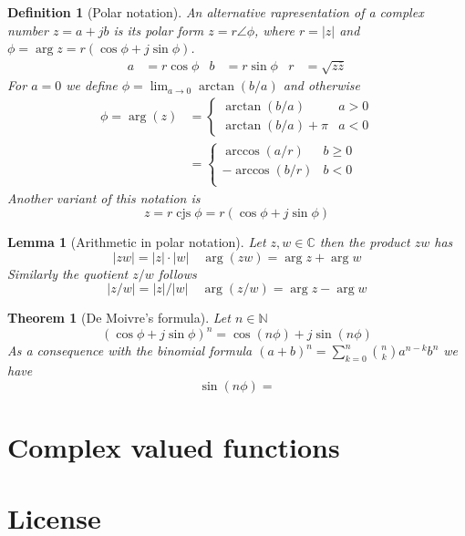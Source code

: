 \documentclass[twocolumn, small]{tex/hsrzf}
\newcommand\Nset{\mathbb{N}}
\newcommand\Cset{\mathbb{C}}
\DeclareMathOperator\cjs{cjs}
\newcommand\conj[1]{\overline{#1}}
\newcommand\len[1]{\lvert#1\rvert}
\theoremstyle{komfourzf}
\newtheorem{theorem}{Theorem}
\newtheorem{definition}{Definition}
\newtheorem{lemma}{Lemma}
\begin{document}
\begin{definition}[Polar notation]
  An alternative rapresentation of a complex number \(z = a + jb\) is its \emph{polar form} \(z = r \angle \phi\), where \(r = \len{z}\) and \(\phi = \arg{z} = r(\cos\phi + j\sin\phi)\).
  \begin{align*}
    a &= r\cos\phi &
    b &= r \sin\phi &
    r &= \sqrt{z\conj{z}}
  \end{align*}
  For \(a = 0\) we define \(\phi = \lim_{a\to 0} \arctan(b/a)\) and otherwise
  \begin{align*}
    \phi = \arg(z)
    &= \begin{cases}
      \arctan(b/a) & a > 0 \\
      \arctan(b/a) + \pi & a < 0
    \end{cases} \\
    &= \begin{cases}
      \arccos(a/r) & b \geq 0 \\
      -\arccos(b/r) & b < 0 \\
    \end{cases}
  \end{align*}
  Another variant of this notation is
  \[
    z = r\cjs\phi = r(\cos\phi + j\sin\phi)
  \]
\end{definition}

\begin{lemma}[Arithmetic in polar notation]
  Let \(z,w\in\Cset\) then the product \(zw\) has
  \[
    \len{zw} = \len{z}\cdot\len{w} \quad
    \arg(zw) = \arg z + \arg w
  \]
  Similarly the quotient \(z/w\) follows
  \[
    \len{z/w} = \len{z}/\len{w} \quad
    \arg(z/w) = \arg z - \arg w
  \]
\end{lemma}

\begin{theorem}[De Moivre's formula]
  Let \(n \in\Nset\)
  \[
    \left(\cos\phi + j\sin\phi\right)^n = \cos(n\phi) + j\sin(n\phi)
  \]
  As a consequence with the binomial formula
  \((a + b)^n = \sum_{k=0}^n \binom{n}{k} a^{n-k} b^n\) we have
  \[
    \sin(n\phi) = 
  \]
\end{theorem}

\section{Complex valued functions}

\section{License}
\doclicenseThis
\end{document}

